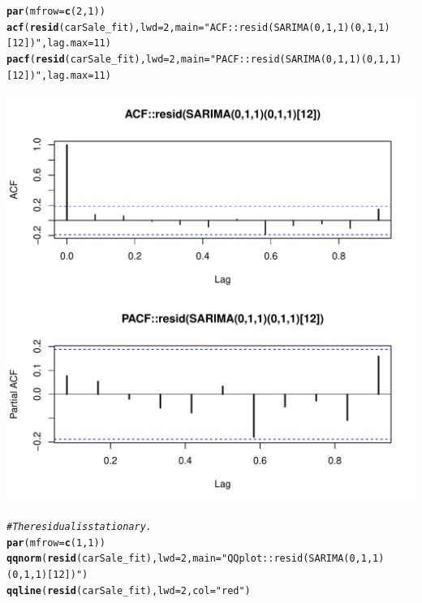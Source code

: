 \documentclass[10pt]{article}\usepackage[]{graphicx}\usepackage[]{color}
\makeatletter
\def\maxwidth{ %
  \ifdim\Gin@nat@width>\linewidth
    \linewidth
  \else
    \Gin@nat@width
  \fi
}
\newcommand{\hlnum}[1]{\textcolor[rgb]{0.686,0.059,0.569}{#1}}%
\newcommand{\hlstr}[1]{\textcolor[rgb]{0.192,0.494,0.8}{#1}}%
\newcommand{\hlcom}[1]{\textcolor[rgb]{0.678,0.584,0.686}{\textit{#1}}}%
\newcommand{\hlstd}[1]{\textcolor[rgb]{0.345,0.345,0.345}{#1}}%
\newcommand{\hlkwc}[1]{\textcolor[rgb]{0.333,0.667,0.333}{#1}}%
\newcommand{\hlkwd}[1]{\textcolor[rgb]{0.737,0.353,0.396}{\textbf{#1}}}%
\newenvironment{kframe}{%
 \def\at@end@of@kframe{}%
 \ifinner\ifhmode%
  \def\at@end@of@kframe{\end{minipage}}%
  \begin{minipage}{\columnwidth}%
 \fi\fi%
 \def\FrameCommand##1{\hskip\@totalleftmargin \hskip-\fboxsep
 \colorbox{shadecolor}{##1}\hskip-\fboxsep
     \hskip-\linewidth \hskip-\@totalleftmargin \hskip\columnwidth}%
 \MakeFramed {\advance\hsize-\width
   \@totalleftmargin\z@ \linewidth\hsize
   \@setminipage}}%
 {\par\unskip\endMakeFramed%
 \at@end@of@kframe}
\newenvironment{knitrout}{}{} %
\makeatother
\begin{document}
\begin{knitrout}
\begin{kframe}\begin{alltt}
\hlkwd{par}\hlstd{(}\hlkwc{mfrow}\hlstd{=}\hlkwd{c}\hlstd{(}\hlnum{2}\hlstd{,}\hlnum{1}\hlstd{))}
\hlkwd{acf}\hlstd{(}\hlkwd{resid}\hlstd{(carSale_fit),}\hlkwc{lwd}\hlstd{=}\hlnum{2}\hlstd{,} \hlkwc{main}\hlstd{=}\hlstr{"ACF::resid(SARIMA(0,1,1)(0,1,1)[12])"}\hlstd{,}\hlkwc{lag.max} \hlstd{=} \hlnum{11}\hlstd{)}
\hlkwd{pacf}\hlstd{(}\hlkwd{resid}\hlstd{(carSale_fit),}\hlkwc{lwd}\hlstd{=}\hlnum{2}\hlstd{,} \hlkwc{main}\hlstd{=}\hlstr{"PACF::resid(SARIMA(0,1,1)(0,1,1)[12])"}\hlstd{,}\hlkwc{lag.max} \hlstd{=} \hlnum{11}\hlstd{)}
\end{alltt}
\end{kframe}
\includegraphics[width=\maxwidth]{figure/unnamed-chunk-36-2} 
\begin{kframe}\begin{alltt}
\hlcom{#The residual is stationary.}
\hlkwd{par}\hlstd{(}\hlkwc{mfrow}\hlstd{=}\hlkwd{c}\hlstd{(}\hlnum{1}\hlstd{,}\hlnum{1}\hlstd{))}
\hlkwd{qqnorm}\hlstd{(}\hlkwd{resid}\hlstd{(carSale_fit),}\hlkwc{lwd}\hlstd{=}\hlnum{2}\hlstd{,} \hlkwc{main}\hlstd{=}\hlstr{"QQplot::resid(SARIMA(0,1,1)(0,1,1)[12])"}\hlstd{)}
\hlkwd{qqline}\hlstd{(}\hlkwd{resid}\hlstd{(carSale_fit),} \hlkwc{lwd}\hlstd{=}\hlnum{2}\hlstd{,} \hlkwc{col}\hlstd{=}\hlstr{"red"}\hlstd{)}
\end{alltt}

\end{kframe}
\end{knitrout}
\end{document}
